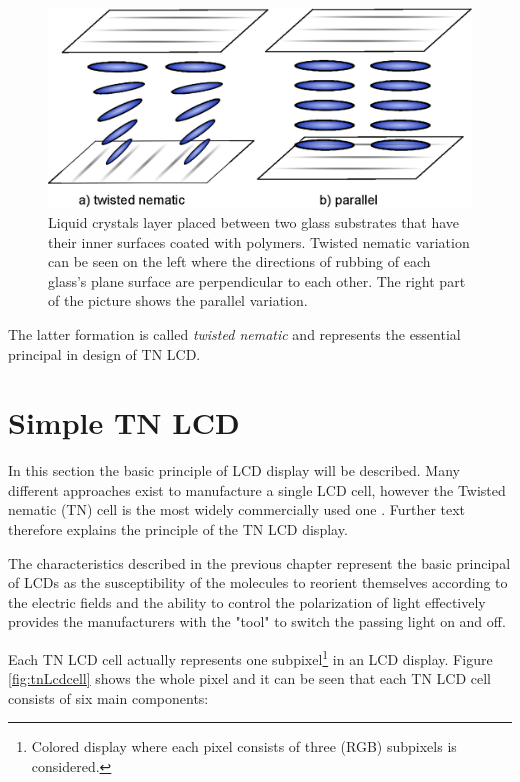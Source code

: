\begin{figure}[hbt]
\centering
\includegraphics[width=12cm]{img/director_prerotation.eps}
\caption{Liquid crystals layer placed between two glass substrates that have their inner surfaces coated with polymers. Twisted nematic variation can be seen on the left where the directions of rubbing of each glass's plane surface are perpendicular to each other. The right part of the picture shows the parallel variation.}
\label{fig:director_prerotation}
\end{figure}

The latter formation is called \textit{twisted nematic} and represents the essential principal in design of TN LCD.

\section{Simple TN LCD}
\label{sec:tnlcd}
In this section the basic principle of LCD display will be described. Many different approaches exist to manufacture a single LCD cell, however the Twisted nematic (TN) cell is the most widely commercially used one \cite[pg.~57]{lueder2010liquid}. Further text therefore explains the principle of the TN LCD display.

The characteristics described in the previous chapter represent the basic principal of LCDs as the susceptibility of the molecules to reorient themselves according to the electric fields and the ability to control the polarization of light effectively provides the manufacturers with the "tool" to switch the passing light on and off.

Each TN LCD cell actually represents one subpixel\footnote{Colored display where each pixel consists of three (RGB) subpixels is considered.} in an LCD display. Figure \ref{fig:tnLcdcell} shows the whole pixel and it can be seen that each TN LCD cell consists of six main components:

